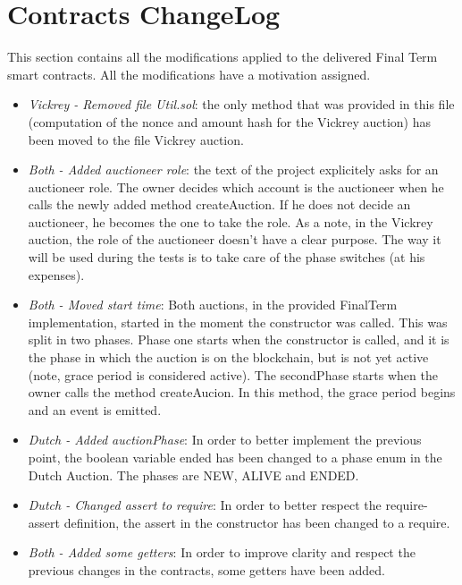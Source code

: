 \documentclass[11pt, a4paper]{report}
\begin{document}
\section*{Contracts ChangeLog}
This section contains all the modifications applied to the delivered Final Term smart contracts. All the modifications have a motivation assigned.
\begin{itemize}
	\item \emph{Vickrey - Removed file Util.sol}: the only method that was provided in this file (computation of the nonce and amount hash for the Vickrey auction) has been moved to the file Vickrey auction. 
	\item \emph{Both - Added auctioneer role}: the text of the project explicitely asks for an auctioneer role. The owner decides which account is the auctioneer when he calls the newly added method createAuction. If he does not decide an auctioneer, he becomes the one to take the role. As a note, in the Vickrey auction, the role of the auctioneer doesn't have a clear purpose. The way it will be used during the tests is to take care of the phase switches (at his expenses).
	\item \emph{Both - Moved start time}: Both auctions, in the provided FinalTerm implementation, started in the moment the constructor was called. This was split in two phases. Phase one starts when the constructor is called, and it is the phase in which the auction is on the blockchain, but is not yet active (note, grace period is considered active). The secondPhase starts when the owner calls the method createAucion. In this method, the grace period begins and an event is emitted.
	\item \emph{Dutch - Added auctionPhase}: In order to better implement the previous point, the boolean variable ended has been changed to a phase enum in the Dutch Auction. The phases are NEW, ALIVE and ENDED.
	\item \emph{Dutch - Changed assert to require}: In order to better respect the require-assert definition, the assert in the constructor has been changed to a require.
	\item \emph{Both - Added some getters}: In order to improve clarity and respect the previous changes in the contracts, some getters have been added.
\end{itemize}
\end{document}
